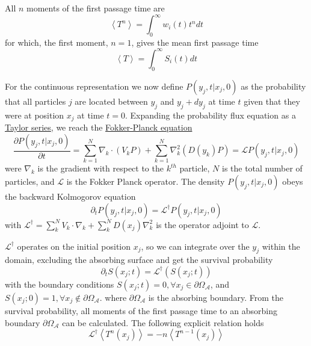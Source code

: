 \documentclass[12pt]{book}
\begin{document}
All $n$ moments of the first passage time are
\begin{equation*}
\left< T^n\right>=\int_0^\infty w_i(t)t^ndt
\end{equation*}
for which, the first moment, $n=1$, gives the mean first passage time 
\begin{equation*}
\left<T\right>=\int_0^\infty S_i(t)dt
\end{equation*}

For the continuous representation we now define $P(y_j,t|x_j,0)$ as the probability that all particles $j$ are located between $y_j$ and $y_j+dy_j$ at time $t$ given that they were at position $x_j$ at time $t=0$. Expanding the probability flux equation as a \href{http://en.wikipedia.org/wiki/Taylor_series}{Taylor series}, we reach the \href{http://en.wikipedia.org/wiki/Fokker%E2%80%93Planck_equation}{Fokker-Planck equation} 
\begin{equation*}
\frac{\partial P(y_j,t|x_j,0)}{\partial t}=\sum_{k=1}^N\nabla_k\cdot(V_kP)+\sum_{k=1}^N\nabla_k^2(D(y_k)P)=\mathcal{L}P(y_j,t|x_j,0)
\end{equation*}
were $\nabla_k$ is the gradient with respect to the $k^{th}$ particle, $N$ is the total number of particles, and $\mathcal{L}$ is the Fokker Planck operator.
The density $P(y_j,t|x_j,0)$ obeys the backward Kolmogorov equation 
\begin{equation*}
\partial_tP(y_j,t|x_j,0)=\mathcal{L^\dagger}P(y_j,t|x_j,0)
\end{equation*} 
with $\mathcal{L^\dagger}=\sum_k^N V_k\cdot\nabla_k+\sum_k^ND(x_j)\nabla_k^2$ is the operator adjoint to $\mathcal{L}$.

$\mathcal{L^\dagger}$ operates on the initial position $x_j$, so we can integrate over the $y_j$ within the domain, excluding the absorbing surface and get the survival probability 
\begin{equation*}
\partial_tS(x_j;t)=\mathcal{L^\dagger}(S(x_j;t))
\end{equation*}
with the boundary conditions $S(x_j;t)=0,\forall x_j\in\partial\Omega_\mathcal{A}$, and $S(x_j;0)=1, \forall x_j\notin\partial\Omega_\mathcal{A}$. where $\partial \Omega_\mathcal{A}$ is the absorbing boundary. From the survival probability, all moments of the first passage time to an absorbing boundary $\partial \Omega_\mathcal{A}$ can be calculated. The following explicit relation holds 
\begin{equation*}
\mathcal{L^\dagger}\left<T^n(x_j)\right> = -n\left<T^{n-1}(x_j)\right>
\end{equation*}
\end{document}

